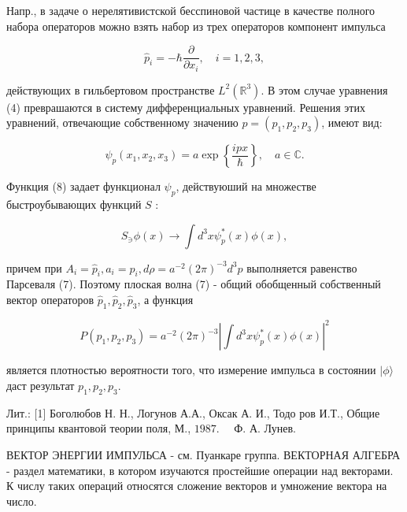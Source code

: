 \documentclass[10pt]{article}
\begin{document}
Напр., в задаче о нерелятивистской бесспиновой частице в качестве полного набора операторов можно взять набор из трех операторов компонент импульса



\[

\hat{p}_{i}=-\hbar \frac{\partial}{\partial x_{i}}, \quad i=1,2,3,

\]



действующих в гильбертовом пространстве $L^{2}\left(\mathbb{R}^{3}\right)$. В этом случае уравнения (4) преврашаются в систему дифференциальных уравнений. Решения этих уравнений, отвечающие собственному значению $p=\left(p_{1}, p_{2}, p_{3}\right)$, имеют вид:



\[

\psi_{p}\left(x_{1}, x_{2}, x_{3}\right)=a \exp \left\{\frac{i p x}{\hbar}\right\}, \quad a \in \mathbb{C} .

\]



Функция (8) задает функционал $\psi_{p}$, действуюший на множестве быстроубывающих функций $S$ :



\[

S_{\ni} \phi(x) \rightarrow \int d^{3} x \psi_{p}^{*}(x) \phi(x),

\]



причем при $A_{i}=\hat{p}_{i}, a_{i}=p_{i}, d \rho=a^{-2}(2 \pi)^{-3} d^{3} p$ выполняется равенство Парсеваля (7). Поэтому плоская волна (7) - общий обобщенный собственный вектор операторов $\hat{p}_{1}, \hat{p}_{2}, \hat{p}_{3}$, а функция



\[

P\left(p_{1}, p_{2}, p_{3}\right)=a^{-2}(2 \pi)^{-3}\left|\int d^{3} x \psi_{p}^{*}(x) \phi(x)\right|^{2}

\]



является плотностью вероятности того, что измерение импульса в состоянии $|\phi\rangle$ даст результат $p_{1}, p_{2}, p_{3}$.



Лит.: [1] Боголюбов Н. Н., Логунов А.А., Оксак А. И., Тодо ров И.Т., Общие принципы квантовой теории поля, М., $1987 . \quad$ Ф. А. Лунев.



ВЕКТОР ЭНЕРГИИ ИМПУЛЬСА - см. Пуанкаре группа. ВЕКТОРНАЯ АЛГЕБРА - раздел математики, в котором изучаются простейшие операции над векторами. К числу таких операций относятся сложение векторов и умножение вектора на число.
\end{document}
